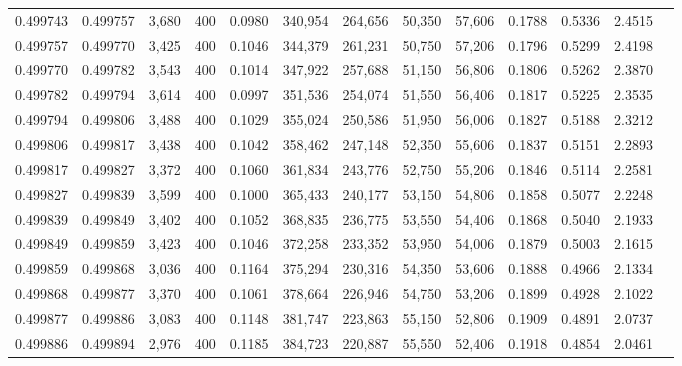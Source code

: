 \begin{tabular}{rrrrrrrrrrrrr}
0.499743 & 0.499757 & 3,680 & 400 &                                     0.0980 & 340,954 & 264,656 &  50,350 &  57,606 & 0.1788 & 0.5336 & 2.4515 \\
0.499757 & 0.499770 & 3,425 & 400 &                                     0.1046 & 344,379 & 261,231 &  50,750 &  57,206 & 0.1796 & 0.5299 & 2.4198 \\
0.499770 & 0.499782 & 3,543 & 400 &                                     0.1014 & 347,922 & 257,688 &  51,150 &  56,806 & 0.1806 & 0.5262 & 2.3870 \\
0.499782 & 0.499794 & 3,614 & 400 &                                     0.0997 & 351,536 & 254,074 &  51,550 &  56,406 & 0.1817 & 0.5225 & 2.3535 \\
0.499794 & 0.499806 & 3,488 & 400 &                                     0.1029 & 355,024 & 250,586 &  51,950 &  56,006 & 0.1827 & 0.5188 & 2.3212 \\
0.499806 & 0.499817 & 3,438 & 400 &                                     0.1042 & 358,462 & 247,148 &  52,350 &  55,606 & 0.1837 & 0.5151 & 2.2893 \\
0.499817 & 0.499827 & 3,372 & 400 &                                     0.1060 & 361,834 & 243,776 &  52,750 &  55,206 & 0.1846 & 0.5114 & 2.2581 \\
0.499827 & 0.499839 & 3,599 & 400 &                                     0.1000 & 365,433 & 240,177 &  53,150 &  54,806 & 0.1858 & 0.5077 & 2.2248 \\
0.499839 & 0.499849 & 3,402 & 400 &                                     0.1052 & 368,835 & 236,775 &  53,550 &  54,406 & 0.1868 & 0.5040 & 2.1933 \\
0.499849 & 0.499859 & 3,423 & 400 &                                     0.1046 & 372,258 & 233,352 &  53,950 &  54,006 & 0.1879 & 0.5003 & 2.1615 \\
0.499859 & 0.499868 & 3,036 & 400 &                                     0.1164 & 375,294 & 230,316 &  54,350 &  53,606 & 0.1888 & 0.4966 & 2.1334 \\
0.499868 & 0.499877 & 3,370 & 400 &                                     0.1061 & 378,664 & 226,946 &  54,750 &  53,206 & 0.1899 & 0.4928 & 2.1022 \\
0.499877 & 0.499886 & 3,083 & 400 &                                     0.1148 & 381,747 & 223,863 &  55,150 &  52,806 & 0.1909 & 0.4891 & 2.0737 \\
0.499886 & 0.499894 & 2,976 & 400 &                                     0.1185 & 384,723 & 220,887 &  55,550 &  52,406 & 0.1918 & 0.4854 & 2.0461 \\

\end{tabular}

